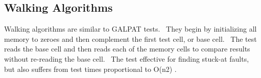 \subsection{Walking Algorithms}
Walking algorithms are similar to GALPAT tests.  They begin by initializing all memory to zeroes and then complement the first test cell, or base cell.  The test reads the base cell and then reads each of the memory cells to compare results without re-reading the base cell.  The test effective for finding stuck-at faults, but also suffers from test times proportional to O(n2) \cite{oldref-10}.  

